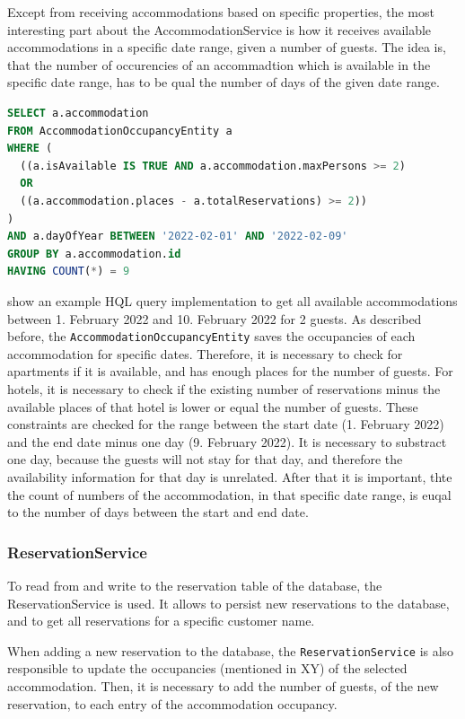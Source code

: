 Except from receiving accommodations based on specific properties, the most interesting part about the AccommodationService is how it receives available accommodations in a specific date range, given a number of guests.
The idea is, that the number of occurencies of an accommadtion which is available in the specific date range, has to be qual the number of days of the given date range.
\begin{lstlisting}[label=lst:02_impl_ejb_accommodation_sql, caption=Example of a HQL query to receive all available accommodations, language=sql]
SELECT a.accommodation
FROM AccommodationOccupancyEntity a
WHERE (
  ((a.isAvailable IS TRUE AND a.accommodation.maxPersons >= 2) 
  OR 
  ((a.accommodation.places - a.totalReservations) >= 2))
)
AND a.dayOfYear BETWEEN '2022-02-01' AND '2022-02-09'
GROUP BY a.accommodation.id
HAVING COUNT(*) = 9 
\end{lstlisting}
 show an example HQL query implementation to get all available accommodations between 1. February 2022 and 10. February 2022 for 2 guests.
As described before, the \texttt{AccommodationOccupancyEntity} saves the occupancies of each accommodation for specific dates. Therefore, it is necessary to check for apartments if it is available, and has enough places for the number of guests. For hotels, it is necessary to check if the existing number of reservations minus the available places of that hotel is lower or equal the number of guests.
These constraints are checked for the range between the start date (1. February 2022) and the end date minus one day (9. February 2022). It is necessary to substract one day, because the guests will not stay for that day, and therefore the availability information for that day is unrelated.
After that it is important, thte the count of numbers of the accommodation, in that specific date range, is euqal to the number of days between the start and end date.


\subsubsection{ReservationService}
To read from and write to the reservation table of the database, the ReservationService is used. It allows to persist new reservations to the database, and to get all reservations for a specific customer name.

When adding a new reservation to the database, the \texttt{ReservationService} is also responsible to update the occupancies (mentioned in XY) of the selected accommodation. Then, it is necessary to add the number of guests, of the new reservation, to each entry of the accommodation occupancy.

